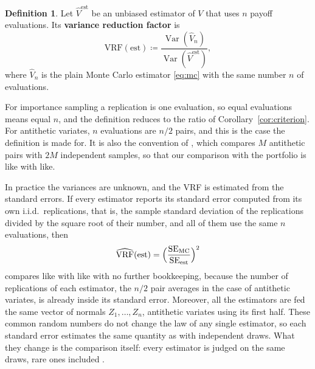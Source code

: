 \documentclass[11pt,a4paper]{article}
\theoremstyle{plain}
\theoremstyle{definition}
\newtheorem{definition}[theorem]{Definition}
\theoremstyle{remark}
\newcommand{\1}{\mathbf{1}}
\newcommand{\eqdef}{\coloneqq}
\newcommand{\Var}{\operatorname{Var}}
\newcommand{\VRF}{\mathrm{VRF}}
\begin{document}
\begin{definition}\label{def:vrf}
Let $\hat V^{\mathrm{est}}$ be an unbiased estimator of $V$ that uses $n$ payoff evaluations. Its \textbf{variance reduction factor} is
\[
  \VRF(\mathrm{est}) \eqdef \frac{\Var(\hat V_n)}{\Var(\hat V^{\mathrm{est}})},
\]
where $\hat V_n$ is the plain Monte Carlo estimator \eqref{eq:mc} with the same number $n$ of evaluations.
\end{definition}

For importance sampling a replication is one evaluation, so equal evaluations means equal $n$, and the definition reduces to the ratio of Corollary~\ref{cor:criterion}. For antithetic variates, $n$ evaluations are $n/2$ pairs, and this is the case the definition is made for. It is also the convention of \cite{portfolio}, which compares $M$ antithetic pairs with $2M$ independent samples, so that our comparison with the portfolio is like with like.

In practice the variances are unknown, and the VRF is estimated from the standard errors. If every estimator reports its standard error computed from its own i.i.d.\ replications, that is, the sample standard deviation of the replications divided by the square root of their number, and all of them use the same $n$ evaluations, then
\begin{equation}\label{eq:vrf-hat}
  \widehat{\VRF}(\mathrm{est}) = \Bigl(\frac{\mathrm{SE}_{\mathrm{MC}}}{\mathrm{SE}_{\mathrm{est}}}\Bigr)^2
\end{equation}
compares like with like with no further bookkeeping, because the number of replications of each estimator, the $n/2$ pair averages in the case of antithetic variates, is already inside its standard error. Moreover, all the estimators are fed the same vector of normals $Z_1, \dots, Z_n$, antithetic variates using its first half. These common random numbers do not change the law of any single estimator, so each standard error estimates the same quantity as with independent draws. What they change is the comparison itself: every estimator is judged on the same draws, rare ones included \cite[\S V.6]{asmussen-glynn}.
\end{document}
